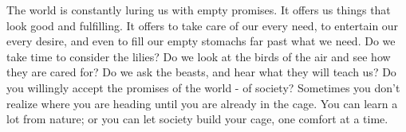 \documentclass[10pt]{article}
\begin{document}
\begin{multicols}{2}
The world is constantly luring us with empty promises. It offers us things that look good and fulfilling. It offers to take care of our every need, to entertain our every desire, and even to fill our empty stomachs far past what we need. Do we take time to consider the lilies? Do we look at the birds of the air and see how they are cared for? Do we ask the beasts, and hear what they will teach us? Do you willingly accept the promises of the world - of society? Sometimes you don't realize where you are heading until you are already in the cage. You can learn a lot from nature; or you can let society build your cage, one comfort at a time.




\end{multicols}


\end{document}
